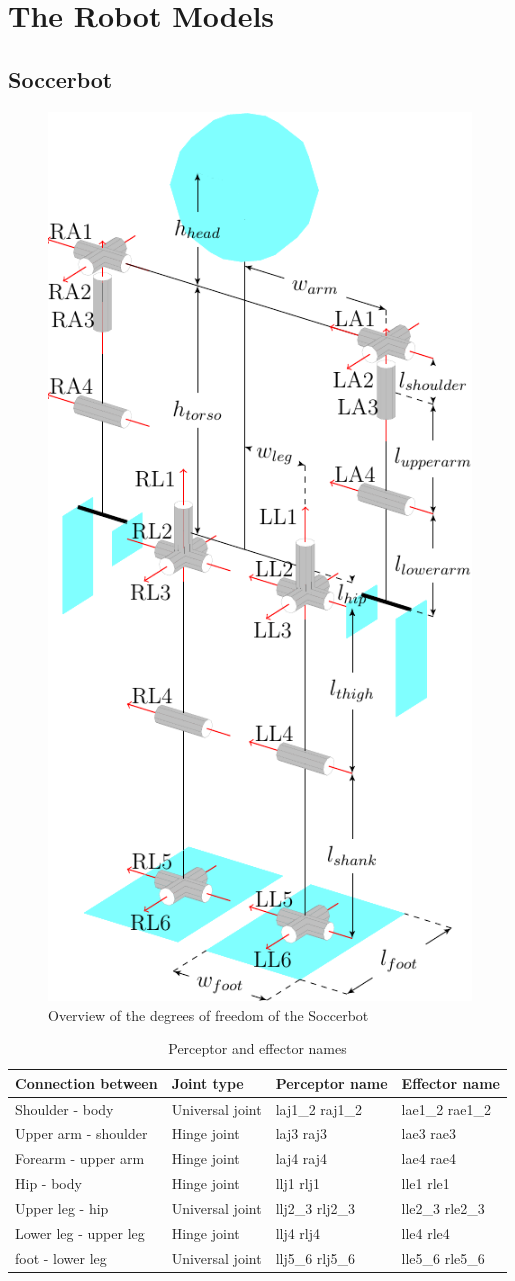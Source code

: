 \chapter{The Robot Models}

\section{Soccerbot}

\begin{figure}[htp]
  \centering
  \includegraphics[height=0.7\textwidth]{fig/soccerbot056}
  \caption{Overview of the degrees of freedom of the Soccerbot}
  \label{fig:soccerbotdof}
\end{figure}

\begin{table}
\label {table:perceptorNames}
\caption{Perceptor and effector names}
\begin{center}
\begin{tabular}{|l|l|l|l|}
\hline
{\bf Connection between}  & {\bf Joint type} & {\bf Perceptor name}& {\bf
Effector name} \\
\hline
Shoulder - body  & Universal joint & laj1\_2  raj1\_2 & lae1\_2   rae1\_2 \\
\hline
Upper arm - shoulder  & Hinge joint & laj3  raj3 & lae3   rae3 \\
\hline
Forearm - upper arm  & Hinge joint & laj4  raj4 & lae4   rae4 \\
\hline
Hip - body  & Hinge joint & llj1  rlj1 & lle1   rle1 \\
\hline
Upper leg - hip & Universal joint & llj2\_3  rlj2\_3 & lle2\_3   rle2\_3 \\
\hline
Lower leg - upper leg & Hinge joint & llj4  rlj4 & lle4   rle4 \\
\hline
foot - lower leg & Universal joint & llj5\_6  rlj5\_6 & lle5\_6   rle5\_6 \\
\hline
\end{tabular}
\end{center}
\end{table}



